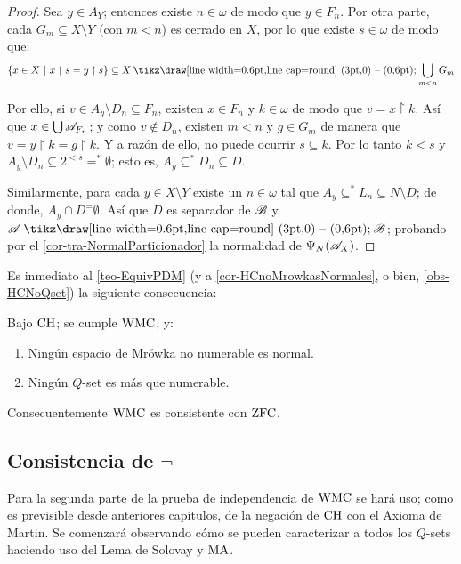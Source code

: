 \begin{proof}
	Sea $y \in A_Y$; entonces existe $n \in \omega$ de modo que $y \in F_n$. Por otra parte, cada $G_m\subseteq X\setminus Y$ (con $m<n$) es cerrado en $X$, por lo que existe $s \in \omega$ de modo que:
	$$ \{ x \in X \tq x \upharpoonright s = y \upharpoonright s \} \subseteq X \setminus \bigcup_{m<n} G_m $$

	Por ello, si $v \in A_y \setminus D_n\subseteq F_n$, existen $x \in F_n$ y $k \in \omega$ de modo que $v = x \upharpoonright k$. Así que $x \in \mbox{$\bigcup$}\, \mathscr{A}_{F_n}$; y como $v \notin D_n$, existen $m<n$ y $g \in G_m$ de manera que $v = y \upharpoonright k = g \upharpoonright k$. Y a razón de ello, no puede ocurrir $s \subseteq k$. Por lo tanto $k<s$ y $A_y \setminus D_n \subseteq 2^{<s} =^* \emptyset$; esto es, $A_y \subseteq^* D_n \subseteq D$.

	Similarmente, para cada $y \in X \setminus Y$ existe un $n \in \omega$ tal que $A_y \subseteq^* L_n \subseteq N \setminus D$; de donde, $A_y \cap D ^= \emptyset$. Así que $D$ es separador de $\mathscr{B}$ y $\ms{A} \setminus \ms{B}$; probando por el \autoref{cor-tra-NormalParticionador} la normalidad de $\Psi_N(\mathscr{A}_X)$.
\end{proof}

Es inmediato al \autoref{teo-EquivPDM} (y a \ref{cor-HCnoMrowkasNormales}, o bien, \ref{obs-HCNoQset}) la siguiente consecuencia:

\begin{corolario}\label{cor-PdmConsistente}
	Bajo $\operatorname{CH}$; se cumple $\operatorname{WMC}$, y:
	\begin{enumerate}
		\item Ningún espacio de Mrówka no numerable es normal.
		\item Ningún $Q$-set es más que numerable.
	\end{enumerate}
	Consecuentemente $\operatorname{WMC}$ es consistente con $\operatorname{ZFC}$.
\end{corolario}

\subsection{Consistencia de \texorpdfstring{$\lnot$}\textsf{WMC}}

Para la segunda parte de la prueba de independencia de $\operatorname{WMC}$ se hará uso; como es previsible desde anteriores capítulos, de la negación de $\operatorname{CH}$ con el Axioma de Martin. Se comenzará observando cómo se pueden caracterizar a todos los $Q$-sets haciendo uso del Lema de Solovay y $\operatorname{MA}$.


